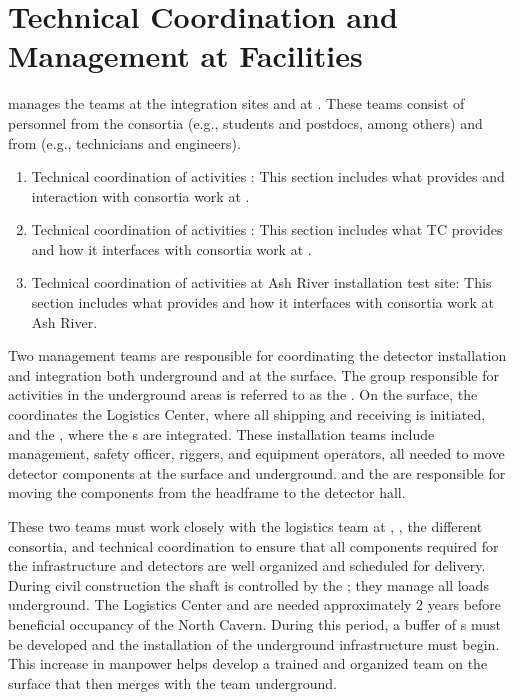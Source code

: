 \chapter{Technical Coordination and Management at Facilities}
\label{vl:tc-facility_mgmt}

  manages the teams at the integration sites and
at \surf. These teams consist of personnel from the consortia
(e.g., students and postdocs, among others) and from  (e.g., technicians and
engineers).  
\begin{enumerate}
 \item Technical coordination of activities \surf: This section
   includes what  provides and interaction with consortia work
   at \surf.
 \item Technical coordination of activities : This section includes
   what TC provides and how it interfaces with consortia work at .
 \item Technical coordination of activities at Ash River installation
   test site: This section includes what  provides and how it
   interfaces with consortia work at Ash River. 
\end{enumerate}



Two management teams are responsible for coordinating the
detector installation and integration both underground and at the
surface. The group responsible for activities in the underground areas
is referred to as the .  On the
surface, the  coordinates the Logistics
Center, where all  shipping and receiving is initiated, and the
, where the 
s are integrated.  These installation teams include management, safety
officer, riggers, and equipment operators, all needed to move detector
components at the surface and underground. \surf and the   are
responsible for moving the components from the headframe to the detector hall.

These two teams must work closely with the  logistics team at
\surf, , the different consortia, and technical coordination to
ensure that all components required for the infrastructure and
detectors are well organized and scheduled for delivery. During
civil construction the shaft is controlled by the ; they manage all loads
underground.  The Logistics Center and  are
needed approximately 2 years before beneficial occupancy of the North
Cavern.  During this period, a buffer of s must be developed 
and  the installation of the underground infrastructure must begin. This
increase in manpower helps develop a trained and organized team on the
surface that then merges with the team underground.


